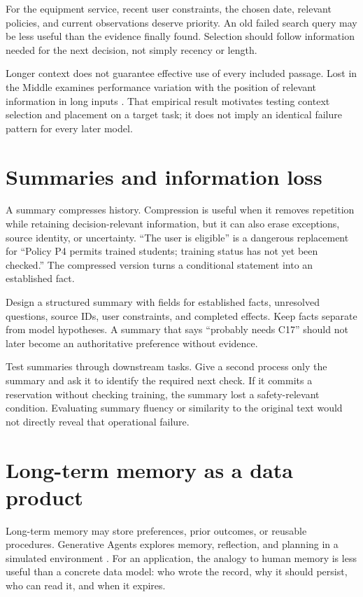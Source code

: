 For the equipment service, recent user constraints, the chosen date, relevant policies, and current observations deserve priority. An old failed search query may be less useful than the evidence finally found. Selection should follow information needed for the next decision, not simply recency or length.

Longer context does not guarantee effective use of every included passage. Lost in the Middle examines performance variation with the position of relevant information in long inputs \cite{lost-middle}. That empirical result motivates testing context selection and placement on a target task; it does not imply an identical failure pattern for every later model.

\section{Summaries and information loss}
A summary compresses history. Compression is useful when it removes repetition while retaining decision-relevant information, but it can also erase exceptions, source identity, or uncertainty. “The user is eligible” is a dangerous replacement for “Policy P4 permits trained students; training status has not yet been checked.” The compressed version turns a conditional statement into an established fact.

Design a structured summary with fields for established facts, unresolved questions, source IDs, user constraints, and completed effects. Keep facts separate from model hypotheses. A summary that says “probably needs C17” should not later become an authoritative preference without evidence.

Test summaries through downstream tasks. Give a second process only the summary and ask it to identify the required next check. If it commits a reservation without checking training, the summary lost a safety-relevant condition. Evaluating summary fluency or similarity to the original text would not directly reveal that operational failure.

\section{Long-term memory as a data product}
Long-term memory may store preferences, prior outcomes, or reusable procedures. Generative Agents explores memory, reflection, and planning in a simulated environment \cite{generative-agents}. For an application, the analogy to human memory is less useful than a concrete data model: who wrote the record, why it should persist, who can read it, and when it expires.

